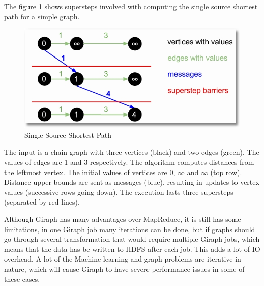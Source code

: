 \documentclass[english]{tktltiki}
\begin{document}
The figure \ref{fig:sssp} shows supersteps involved with computing the single source shortest path for a simple graph.
\begin{figure}[ht!]
\centering
\includegraphics[width=130mm]{figures/giraphsuperstep.jpg}
\caption{Single Source Shortest Path  \protect \footnotemark}
\label{fig:sssp}
\end{figure}

The input is a chain graph with three vertices (black) and two edges (green). The values of edges are 1 and 3 respectively. The algorithm computes distances from the leftmost vertex. The initial values of vertices are 0, $\infty$ and $\infty$ (top row). Distance upper bounds are sent as messages (blue), resulting in updates to vertex values (successive rows going down). The execution lasts three supersteps (separated by red lines).

Although Giraph has many advantages over MapReduce, it is still has some limitations, in one Giraph job many iterations can be done, but if graphs should go through several transformation that would require multiple Giraph jobs, which means that the data has be written to HDFS after each job. This adds a lot of IO overhead. A lot of the Machine learning and graph problems are iterative in nature, which will cause Giraph to have severe performance issues in some of these cases. 
\end{document}
